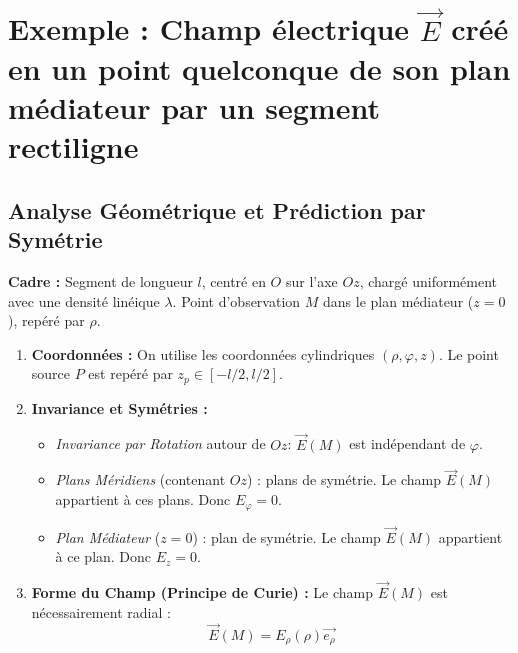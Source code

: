 \documentclass[french]{yLectureNote}
\renewcommand{\vec}{\overrightarrow}
\newcommand{\dd}{\mathrm{d}}
\newcommand{\E}{\vec{E}(M)}
\newcommand{\er}{\vec{e_{\rho}}}
\begin{document}
%
%
%
%
%



\section{Exemple : Champ électrique $\vec{E}$ créé en un point quelconque de son plan médiateur par un segment rectiligne}
\subsection{Analyse Géométrique et Prédiction par Symétrie}
\textbf{Cadre :} Segment de longueur $l$, centré en $O$ sur l'axe $Oz$, chargé uniformément avec une densité linéique $\lambda$. Point d'observation $M$ dans le plan médiateur ($z=0$), repéré par $\rho$.

\begin{enumerate}
    \item \textbf{Coordonnées :} On utilise les coordonnées cylindriques $(\rho, \varphi, z)$. Le point source $P$ est repéré par $z_p \in [-l/2, l/2]$.
    \item \textbf{Invariance et Symétries :}
    \begin{itemize}
        \item \textit{Invariance par Rotation} autour de $Oz$: $\E$ est indépendant de $\varphi$.
        \item \textit{Plans Méridiens} (contenant $Oz$) : plans de symétrie. Le champ $\E$ appartient à ces plans. Donc $E_{\varphi} = 0$.
        \item \textit{Plan Médiateur} ($z=0$) : plan de symétrie. Le champ $\E$ appartient à ce plan. Donc $E_z = 0$.
    \end{itemize}
    \item \textbf{Forme du Champ (Principe de Curie) :} Le champ $\E$ est nécessairement radial :
    $$\E = E_{\rho}(\rho) \er$$
\end{enumerate}
\end{document}
